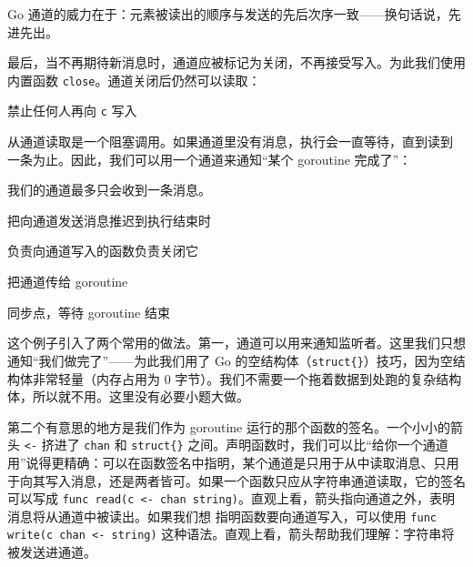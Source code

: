 Go 通道的威力在于：元素被读出的顺序与发送的先后次序一致——换句话说，先进先出。

最后，当不再期待新消息时，通道应被标记为关闭，不再接受写入。为此我们使用内置函数 \texttt{close}。通道关闭后仍然可以读取：


\begin{codeannotations}
\item 禁止任何人再向 \texttt{c} 写入
\end{codeannotations}

从通道读取是一个阻塞调用。如果通道里没有消息，执行会一直等待，直到读到
一条为止。因此，我们可以用一个通道来通知``某个 goroutine 完成了''：


\begin{codeannotations}
\item 我们的通道最多只会收到一条消息。
\item 把向通道发送消息推迟到执行结束时
\item 负责向通道写入的函数负责关闭它
\item 把通道传给 goroutine
\item 同步点，等待 goroutine 结束
\end{codeannotations}

这个例子引入了两个常用的做法。第一，通道可以用来通知监听者。这里我们只想通知``我们做完了''——为此我们用了 Go 的空结构体（\texttt{struct\{\}}）技巧，因为空结构体非常轻量（内存占用为 0 字节）。我们不需要一个拖着数据到处跑的复杂结构体，所以就不用。这里没有必要小题大做。

第二个有意思的地方是我们作为 goroutine 运行的那个函数的签名。一个小小的箭头 \texttt{<-} 挤进了 \texttt{chan} 和 \texttt{struct\{\}} 之间。声明函数时，我们可以比``给你一个通道用''说得更精确：可以在函数签名中指明，某个通道是只用于从中读取消息、只用于向其写入消息，还是两者皆可。如果一个函数只应从字符串通道读取，它的签名可以写成 \texttt{func read(c <- chan string)}。直观上看，箭头指向通道之外，表明消息将从通道中被读出。如果我们想
指明函数要向通道写入，可以使用 \texttt{func write(c chan <- string)} 这种语法。直观上看，箭头帮助我们理解：字符串将被发送进通道。

